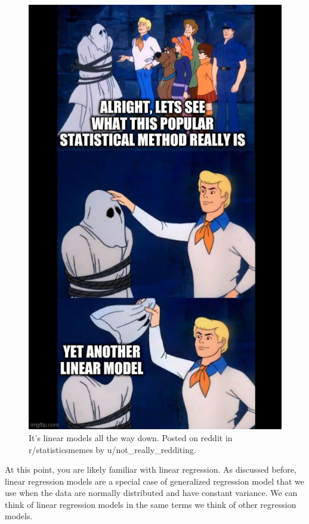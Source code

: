 \documentclass[
]{book}
\begin{document}
\begin{figure}
\centering
\includegraphics{images/scooby_doo_meme.jpg}
\caption{It's linear models all the way down. Posted on reddit in r/statisticsmemes by u/not\_really\_redditing.}
\end{figure}

At this point, you are likely familiar with linear regression. As discussed before, linear regression models are a special case of generalized regression model that we use when the data are normally distributed and have constant variance. We can think of linear regression models in the same terms we think of other regression models.
\end{document}
